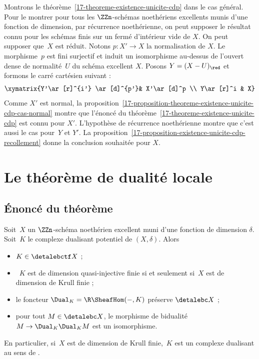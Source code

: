 \documentclass[10pt]{../fichiers-configuration-latex/smfart}
\begin{document}
Montrons le théorème~\ref{17-theoreme-existence-unicite-cdp} dans le cas
général. Pour le montrer pour tous les $\ZZn$-schémas noethériens
excellents munis d'une fonction de dimension, par récurrence noethérienne,
on peut supposer le résultat connu pour les schémas finis sur un fermé
d'intérieur vide de $X$. On peut supposer que $X$ est réduit. Notons
$p\colon X'\to X$ la normalisation de $X$. Le morphisme $p$ est fini
surjectif et induit un isomorphisme au-dessus de l'ouvert dense de
normalité $U$ du schéma excellent $X$. Posons $Y=(X-U)_\red$ et formons
le carré cartésien suivant :
\[
\xymatrix{Y'\ar[r]^{i'} \ar[d]^{p'}& X'\ar[d]^p \\ Y\ar[r]^i & X}
\]
Comme $X'$ est normal, la 
proposition~\ref{17-proposition-theoreme-existence-unicite-cdp-cas-normal}
montre que l'énoncé du théorème~\ref{17-theoreme-existence-unicite-cdp} est
connu pour $X'$. L'hypothèse de récurrence noethérienne montre que c'est
aussi le cas pour $Y$ et $Y'$. La 
proposition~\ref{17-proposition-existence-unicite-cdp-recollement} donne la
conclusion souhaitée pour $X$.

\section{Le théorème de dualité locale}%
\label{17-section-dualite}

\subsection{Énoncé du théorème}%
\begin{theoreme2}\label{17-theoreme-dualite-locale}
Soit $X$ un $\ZZn$-schéma noethérien excellent 
muni d'une fonction de dimension $\delta$.
Soit $K$ le complexe dualisant potentiel de $(X,\delta)$. Alors
\begin{itemize}
\item $K\in\detalebctf X$ ;
\item $K$ est de dimension quasi-injective finie si et seulement si $X$ est
de dimension de Krull finie ;
\item le foncteur $\Dual_K=\R\SheafHom(-,K)$ préserve $\detalebc X$ ;
\item pour tout $M\in\detalebc X$, le morphisme de bidualité $M\to
\Dual_K\Dual_K M$ est un isomorphisme.
\end{itemize}
En particulier, si $X$ est de dimension de Krull finie, $K$ est un complexe
dualisant au sens de .
\end{theoreme2}
\end{document}
